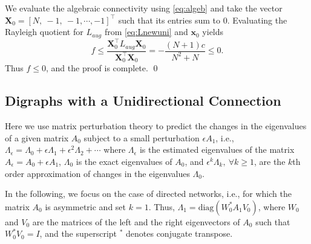 \documentclass[%
 reprint,
 amsmath,amssymb,
 aip,
]{revtex4-2}
\def \bx {\pmb{x}}
\def \bX {\pmb{X}}
\def \diag {\text{diag}}
\theoremstyle{italichead}
\theoremstyle{definition}
\begin{document}
{    We evaluate the algebraic connectivity using \eqref{eq:algeb} and take the vector $\bX_0 = [N, \ -1, \allowbreak \ -1, \allowbreak \cdots, \allowbreak  -1]^\top$ such that its entries sum to 0.
    Evaluating the Rayleigh quotient for $L_{aug}$ from \eqref{eq:Lnewuni} and $\bx_0$ yields
    \begin{equation*}
        f \leq \dfrac{\bX_0^\top L_{aug} \bX_0}{\bX_0^\top \bX_0} = -\dfrac{(N+1) c}{N^2 + N} \leq 0.
    \end{equation*}
    Thus $f \leq 0$, and the proof is complete. \hfill \qed



\subsection{Digraphs with a Unidirectional Connection} \label{sec:uni}

Here we use matrix perturbation theory \cite{bamieh2022tutorial} to predict the changes in the eigenvalues of a given matrix $A_0$ subject to a small perturbation $\epsilon A_1$, i.e., $\Lambda_\epsilon = \Lambda_0 + \epsilon \Lambda_1 + \epsilon^2 \Lambda_2 + \cdots$ where $\Lambda_\epsilon$ is the estimated eigenvalues of the matrix $A_\epsilon = A_0 + \epsilon A_1$, $\Lambda_0$ is the exact eigenvalues of $A_0$, and $\epsilon^k \Lambda_k, \ \forall k \geq 1$, are the $k$th order approximation of changes in the eigenvalues $\Lambda_0$.


In the following, we focus on the case of directed networks, i.e., for which the matrix $A_0$ is asymmetric and set $k = 1$.
Thus, $\Lambda_1 = \diag(W_0^* A_1 V_0)$, where $W_0$ and $V_0$ are the matrices of the left and the right eigenvectors of $A_0$ such that $W_0^* V_0 = I$, and the superscript ${}^*$ denotes conjugate transpose.


}
\end{document}
